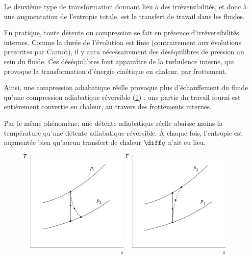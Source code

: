 		Le deuxième type de transformation donnant lieu à des irréversibilités, et donc à une augmentation de l’entropie totale, est le transfert de travail dans les fluides.

		En pratique, toute détente ou compression se fait en présence d’irréversibilités internes. Comme la durée de l’évolution est finie (contrairement aux évolutions prescrites par Carnot), il y aura nécessairement des déséquilibres de pression au sein du fluide. Ces déséquilibres font apparaître de la turbulence interne, qui provoque la transformation d’énergie cinétique en chaleur, par frottement.

		Ainsi, une compression adiabatique réelle provoque plus d’échauffement du fluide qu’une compression adiabatique réversible (\cref{fig_t-s_détentes_compressions}) : une partie du travail fourni est entièrement convertie en chaleur, au travers des frottements internes.

		Par le même phénomène, une détente adiabatique réelle abaisse moins la température qu’une détente adiabatique réversible. À chaque fois, l’entropie est augmentée bien qu’aucun transfert de chaleur $\diff q$ n’ait eu lieu.
		
		\begin{figure}
			\begin{center}
				\includegraphics[width=0.48\textwidth]{images/ts_gp_detente.png}
				\includegraphics[width=0.48\textwidth]{images/ts_gp_compression.png}
			\end{center}
			\label{fig_t-s_détentes_compressions}
		\end{figure}

